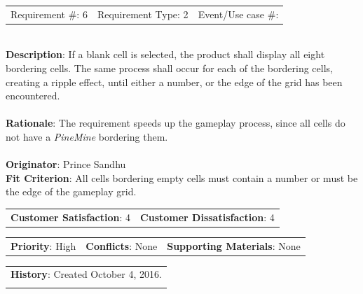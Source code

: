 \documentclass[12pt, titlepage]{article}
\begin{document}
\begin{reqbox}

\begin{tabular}{lll}
Requirement \#: 6 & Requirement Type: 2 & Event/Use case \#: \\
\end{tabular} \\

\textbf{Description}: If a blank cell is selected, the product shall display all eight bordering cells. The same process
shall occur for each of the bordering cells, creating a ripple effect, until either a number, or the edge of the grid has 
been encountered. \\ \\
\textbf{Rationale}: The requirement speeds up the gameplay process, since all cells do not have a \textit{PineMine} bordering them. \\ \\
\textbf{Originator}: Prince Sandhu \\
\textbf{Fit Criterion}: All cells bordering empty cells must contain a number or must be the edge of the gameplay grid. \\

\begin{tabular}{ll}
\textbf{Customer Satisfaction}: 4 & \textbf{Customer Dissatisfaction}: 4 \\
\end{tabular}

\begin{tabular}{lll}
\textbf{Priority}: High & \textbf{Conflicts}: None & \textbf{Supporting Materials}: None \\
\end{tabular}

\begin{tabular}{l}
\textbf{History}: Created October 4, 2016.\\ \\
\end{tabular} \\

\end{reqbox}
\end{document}
